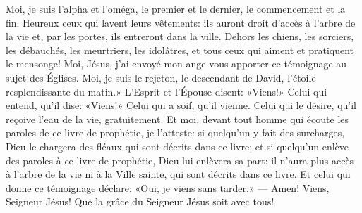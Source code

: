 Moi, je suis l’alpha et l’oméga,
	le premier et le dernier, le commencement et la fin.
Heureux ceux qui lavent leurs vêtements:
	ils auront droit d’accès à l’arbre de la vie
	et, par les portes, ils entreront dans la ville.
Dehors les chiens, les sorciers, les débauchés, les meurtriers,
	les idolâtres, et tous ceux qui aiment et pratiquent le mensonge!
Moi, Jésus,
	j’ai envoyé mon ange vous apporter ce témoignage au sujet des Églises.
Moi, je suis le rejeton, le descendant de David,
	l’étoile resplendissante du matin.»
L’Esprit et l’Épouse disent: «Viens!»
	Celui qui entend, qu’il dise: «Viens!»
	Celui qui a soif, qu’il vienne.
	Celui qui le désire, qu’il reçoive l’eau de la vie, gratuitement.
Et moi, devant tout homme qui écoute les paroles de ce livre de prophétie,
	je l’atteste: si quelqu’un y fait des surcharges,
	Dieu le chargera des fléaux qui sont décrits dans ce livre;
	et si quelqu’un enlève des paroles à ce livre de prophétie,
	Dieu lui enlèvera sa part:
	il n’aura plus accès à l’arbre de la vie ni à la Ville sainte,
		qui sont décrits dans ce livre.
Et celui qui donne ce témoignage déclare:
	«Oui, je viens sans tarder.»
	--- Amen! Viens, Seigneur Jésus!
Que la grâce du Seigneur Jésus soit avec tous!
